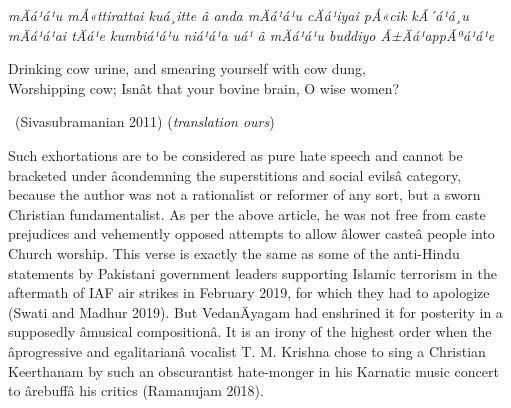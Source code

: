 \begin{myquote}
\textit{mÄá¹­á¹­u mÅ«ttirattai kuá¸itte â anda mÄá¹­á¹­u cÄá¹iyai pÅ«cik kÃ´á¹á¸u\\ mÄá¹­á¹­ai tÄá¹e kumbiá¹­á¹­u niá¹á¹a uá¹ â mÄá¹­á¹­u buddiyo Ã±Äá¹appÃªá¹á¹e}
\end{myquote}

\begin{myquote}
\end{myquote}

\begin{myquote}
Drinking cow urine, and smearing yourself with cow dung,\\ Worshipping cow; Isnât that your bovine brain, O wise women? 

~\hfill (Sivasubramanian 2011) (\textit{translation ours})
\end{myquote}

\newpage

Such exhortations are to be considered as pure hate speech and cannot be bracketed under âcondemning the superstitions and social evilsâ category, because the author was not a rationalist or reformer of any sort, but a sworn Christian fundamentalist. As per the above article, he was not free from caste prejudices and vehemently opposed attempts to allow âlower casteâ people into Church worship. This verse is exactly the same as some of the anti-Hindu statements by Pakistani government leaders supporting Islamic terrorism in the aftermath of IAF air strikes in February 2019, for which they had to apologize (Swati and Madhur 2019). But VedanÄyagam had enshrined it for posterity in a supposedly âmusical compositionâ. It is an irony of the highest order when the âprogressive and egalitarianâ vocalist T. M. Krishna chose to sing a Christian Keerthanam by such an obscurantist hate-monger in his Karnatic music concert to ârebuffâ his critics (Ramanujam 2018).

